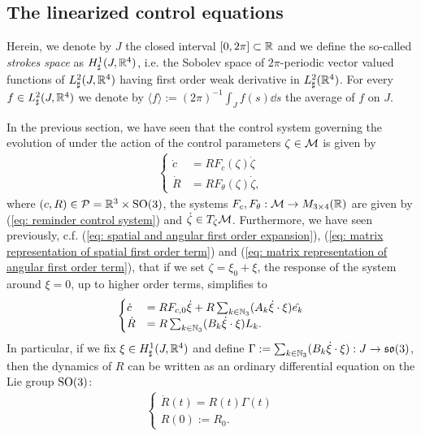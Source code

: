 \subsection{The linearized control equations}
Herein, we denote by $J$ the closed interval  $[0,2\pi] \subset \mathbb{R}$ and we define the so-called \emph{strokes space} as $H_\sharp^1(J, \mathbb{R}^4)$, i.e. the Sobolev space of $2\pi$-periodic vector valued functions of $L_{\sharp}^2(J, \mathbb{R}^4)$ having first order weak derivative in $L_{\sharp}^2(\mathbb{R}^4)$. For every $f \in L^{2}_{\sharp}(J, \mathbb{R}^4)$ we denote by $\langle f \rangle := (2\pi)^{-1} \int_{J} f(s) \dd s$ the average of $f$ on $J$.

In the previous section, we have seen that the control system governing the evolution of \spr under the action of the control parameters $\zeta \in \mathcal{M}$ is given by
\begin{align}
\begin{cases}
	\dot{c} &= R F_c(\zeta) \dot{\zeta}\\
	\dot{R} &= R F_{\theta}(\zeta) \dot{\zeta},
\end{cases}
\end{align}
where $(c,R) \in \mathcal{P} = \mathbb{R}^3 \times \operatorname{SO}(3)$, the systems $F_{c}, F_{\theta}: \mathcal{M} \to M_{3 \times
 4}(\mathbb{R})$ are given by (\ref{eq: reminder control system}) and $\dot{\zeta}  \in T_{\zeta}\mathcal{M}$. Furthermore, we have seen previously, c.f. (\ref{eq: spatial and angular first order expansion}), (\ref{eq: matrix representation of spatial first order term}) and (\ref{eq: matrix representation of angular first order term}), that if we set $\zeta = \xi_0 + \xi$, the response of the system around $\xi = 0$, up to higher order terms, simplifies to
 \begin{align}
 \label{eq: dynamics first approx}
 \begin{cases}
 	\dot{c} &= R F_{c,0} \dot{\xi} + R \sum_{k \in \mathbb{N}_3}(A_k \dot{\xi} \cdot \xi)\hat{e_k}\\
 	\dot{R} &= R \sum_{k \in \mathbb{N}_3} (B_k \dot{\xi} \cdot \xi) L_k.
 \end{cases}
 \end{align}
In particular, if we fix $\xi \in H^1_{\sharp}(J, \mathbb{R}^4)$ and define $\Gamma := \sum_{k \in \mathbb{N}_3} (B_k \dot{\xi} \cdot \xi): J \to \mathfrak{so}(3)$, then the dynamics of $R$ can be written as an ordinary differential equation on the Lie group $\operatorname{SO}(3)$:
\begin{align}
\label{eq: orientation ode}
\begin{cases}
	\dot{R}(t) = R(t) \Gamma(t)\\
	R(0) := R_0.
\end{cases}
\end{align}

